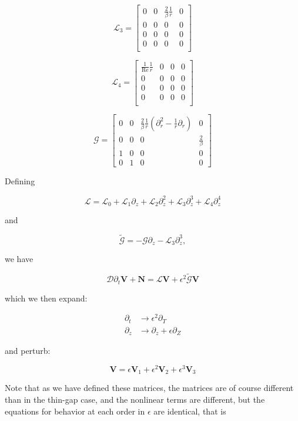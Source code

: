 \documentclass{paper}
\newcommand{\beq}{\begin{equation}}
\newcommand{\eeq}{\end{equation}}
\newcommand\reye{\mathrm{Re}}
\begin{document}
\beq
\mathcal{L}_3 = \left[\begin{matrix}
0 & 0 & \frac{2}{\beta} \frac{1}{r} & 0 \\
0 & 0 & 0 & 0 \\
0 & 0 & 0 & 0 \\
0 & 0 & 0 & 0 \\
\end{matrix}\right]
\eeq

\beq
\mathcal{L}_4 = \left[\begin{matrix}
\frac{1}{\reye}\frac{1}{r} & 0 & 0 & 0 \\
0 & 0 & 0 & 0 \\
0 & 0 & 0 & 0 \\
0 & 0 & 0 & 0 \\
\end{matrix}\right]
\eeq

\beq
\mathcal{G} = \left[\begin{matrix}
0 & 0 & \frac{2}{\beta} \frac{1}{r} \left(\partial_r^2 - \frac{1}{r}\partial_r\right) & 0 \\
0 & 0 & 0 & \frac{2}{\beta}\\
1 & 0 & 0 & 0\\
0 & 1 & 0 & 0
\end{matrix}\right] 
\eeq

Defining 

\beq
\mathcal{L}  = \mathcal{L}_0 + \mathcal{L}_1\partial_z + \mathcal{L}_2\partial_z^2 + \mathcal{L}_3\partial_z^3 + \mathcal{L}_4\partial_z^4
\eeq

and

\beq
\mathcal{\widetilde{G}} = - \mathcal{G} \partial_z - \mathcal{L}_3 \partial_z^3, 
\eeq

we have 

\beq
\mathcal{D} \partial_t \mathbf{V} + \mathbf{N} = \mathcal{L}\mathbf{V} + \epsilon^2 \mathcal{\widetilde{G}} \mathbf{V}
\eeq

which we then expand:

\beq
\begin{split}
 \partial_t & \rightarrow \epsilon^2 \partial_T \\
 \partial_z & \rightarrow \partial_z + \epsilon \partial_Z
\end{split}
\eeq

and perturb:

\beq
\mathbf{V} = \epsilon\mathbf{V}_1 + \epsilon^2 \mathbf{V}_2 + \epsilon^3 \mathbf{V}_3
\eeq

Note that as we have defined these matrices, the matrices are of course different than in the thin-gap case, and the nonlinear terms are different, but the equations for behavior at each order in $\epsilon$ are identical, that is
\end{document}
